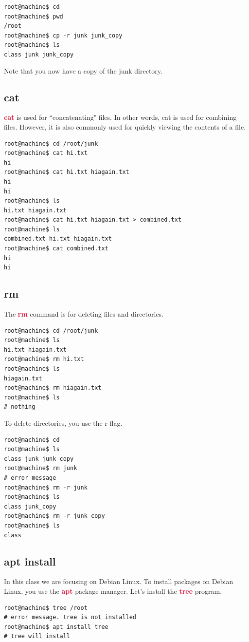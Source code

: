 \documentclass[12pt,letter]{article}
\newcommand{\bashcommand}[1]{\textcolor{crimson}{\textbf{#1}}}
\begin{document}
\begin{lstlisting}[style=term]
root@machine$ cd 
root@machine$ pwd
/root
root@machine$ cp -r junk junk_copy
root@machine$ ls
class junk junk_copy
\end{lstlisting}
Note that you now have a copy of the junk directory.

\subsection{cat}
\bashcommand{cat} is used for ``concatenating" files. In other words, cat is used for combining files. However, it is also commonly used for quickly viewing the contents of a file.
\begin{lstlisting}[style=term]
root@machine$ cd /root/junk
root@machine$ cat hi.txt
hi
root@machine$ cat hi.txt hiagain.txt
hi
hi
root@machine$ ls
hi.txt hiagain.txt
root@machine$ cat hi.txt hiagain.txt > combined.txt
root@machine$ ls
combined.txt hi.txt hiagain.txt
root@machine$ cat combined.txt
hi
hi
\end{lstlisting}

\subsection{rm}
The \bashcommand{rm} command is for deleting files and directories.
\begin{lstlisting}[style=term]
root@machine$ cd /root/junk
root@machine$ ls
hi.txt hiagain.txt
root@machine$ rm hi.txt
root@machine$ ls
hiagain.txt
root@machine$ rm hiagain.txt
root@machine$ ls
# nothing
\end{lstlisting}

To delete directories, you use the r flag.

\begin{lstlisting}[style=term]
root@machine$ cd 
root@machine$ ls
class junk junk_copy
root@machine$ rm junk
# error message
root@machine$ rm -r junk
root@machine$ ls
class junk_copy
root@machine$ rm -r junk_copy
root@machine$ ls
class
\end{lstlisting}

\subsection{apt install}
In this class we are focusing on Debian Linux. To install packages on Debian Linux, you use the \bashcommand{apt} package manager. Let's install the \bashcommand{tree} program.

\begin{lstlisting}[style=term]
root@machine$ tree /root
# error message. tree is not installed
root@machine$ apt install tree
# tree will install
\end{lstlisting}
\end{document}
